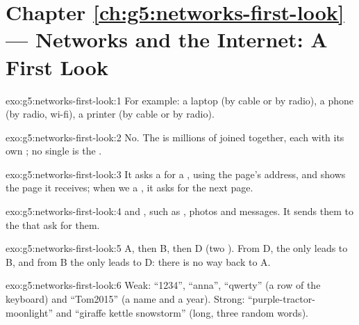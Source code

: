 \section*{Chapter \ref{ch:g5:networks-first-look} --- Networks and the Internet: A First Look}

\begin{solution}{exo:g5:networks-first-look:1}
For example: a laptop (by cable or by radio), a phone (by radio, wi-fi), a
printer (by cable or by radio).
\end{solution}

\begin{solution}{exo:g5:networks-first-look:2}
No. The  is millions of  joined together, each with its own
; no single  is the .
\end{solution}

\begin{solution}{exo:g5:networks-first-look:3}
It asks a  for a , using the page's address, and shows the page
it receives; when we  a , it asks for the next page.
\end{solution}

\begin{solution}{exo:g5:networks-first-look:4}
 and , such as , photos and messages. It sends them to
the  that ask for them.
\end{solution}

\begin{solution}{exo:g5:networks-first-look:5}
A, then B, then D (two ). From D, the only  leads to B, and from B
the only  leads to D: there is no way back to A.
\end{solution}

\begin{solution}{exo:g5:networks-first-look:6}
Weak: ``1234'', ``anna'', ``qwerty'' (a row of the keyboard) and ``Tom2015''
(a name and a year). Strong: ``purple-tractor-moonlight'' and ``giraffe kettle
snowstorm'' (long, three random words).
\end{solution}

